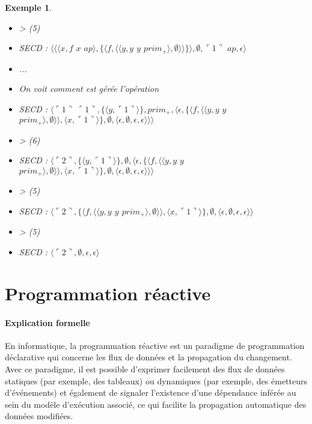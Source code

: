 \documentclass[10pt,a4paper]{report}
\newtheorem{ex}{Exemple}
\begin{document}
\begin{ex}
\begin{itemize}
		\item[] > (5)
		\item[] SECD : $\langle\langle\langle x,f$ $x$ $ap\rangle,\{\langle f,\langle\langle y,y$ $y$ $prim_{+}\rangle,\emptyset\rangle\rangle\}\rangle,\emptyset,\ulcorner 1\urcorner$ $ap,\epsilon\rangle$
		\item[] ...
		\item[] On voit comment est gérée l'opération
		\item[] SECD : $\langle\ulcorner 1\urcorner$ $\ulcorner 1\urcorner,\{\langle y,\ulcorner 1\urcorner\rangle\},prim_{+},\langle\epsilon,\{\langle f,\langle\langle y,y$ $y$ $prim_{+}\rangle,\emptyset\rangle\rangle,\langle x,\ulcorner 1\urcorner\rangle\} ,\emptyset,\langle\epsilon,\emptyset,\epsilon,\epsilon\rangle\rangle\rangle$
		\item[] > (6)
		\item[] SECD : $\langle\ulcorner 2\urcorner,\{\langle y,\ulcorner 1\urcorner\rangle\},\emptyset,\langle\epsilon,\{\langle f,\langle\langle y,y$ $y$ $prim_{+}\rangle,\emptyset\rangle\rangle,\langle x,\ulcorner 1\urcorner\rangle\} ,\emptyset,\langle\epsilon,\emptyset,\epsilon,\epsilon\rangle\rangle\rangle$
		\item[] > (5)
		\item[] SECD : $\langle\ulcorner 2\urcorner,\{\langle f,\langle\langle y,y$ $y$ $prim_{+}\rangle,\emptyset\rangle\rangle,\langle x,\ulcorner 1\urcorner\rangle\} ,\emptyset,\langle\epsilon,\emptyset,\epsilon,\epsilon\rangle\rangle$
		\item[] > (5)
		\item[] SECD : $\langle\ulcorner 2\urcorner,\emptyset,\epsilon,\epsilon\rangle$
	\end{itemize}
\end{ex}
\newpage



\section{Programmation réactive}


\paragraph{Explication formelle}
En informatique, la programmation réactive est un paradigme de programmation déclarative qui concerne les flux de données et la propagation du changement. Avec ce paradigme, il est possible d’exprimer facilement des flux de données statiques (par exemple, des tableaux) ou dynamiques (par exemple, des émetteurs d’événements) et également de signaler l’existence d’une dépendance inférée au sein du modèle d’exécution associé, ce qui facilite la propagation automatique des données modifiées.
\medbreak
\end{document}
